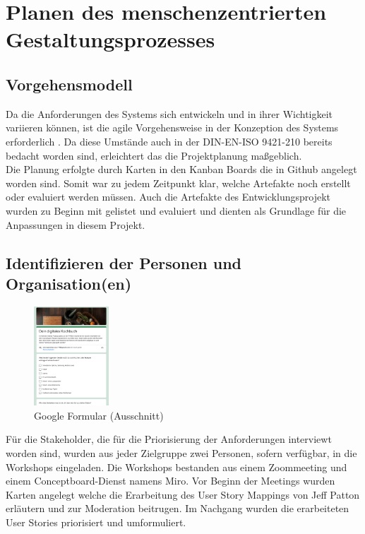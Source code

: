 \chapter{Planen des menschenzentrierten Gestaltungsprozesses}
\section{Vorgehensmodell}
Da die Anforderungen des Systems sich entwickeln und in ihrer Wichtigkeit variieren können, ist die agile Vorgehensweise in
der Konzeption des Systems erforderlich \citep[{``Agile methods are adaptive rather than predictive.''}]{TheNewMe5:online}. Da diese Umstände auch in der DIN-EN-ISO 9421-210 \citep{DINISO_2010} bereits bedacht worden sind, erleichtert das die Projektplanung maßgeblich.\\
Die Planung erfolgte durch Karten in den Kanban Boards die in Github angelegt worden sind. Somit war zu jedem Zeitpunkt klar, welche Artefakte noch erstellt oder evaluiert werden müssen. Auch die Artefakte des Entwicklungsprojekt wurden zu Beginn mit gelistet und evaluiert und dienten als Grundlage für die Anpassungen in diesem Projekt. \\

\section{Identifizieren der Personen und Organisation(en)}
\begin{figure}
  \centering
    \includegraphics[width=0.25\textwidth]{images/umfrage.png}
  \centering
\caption[Google Formular (Ausschnitt)]{Google Formular (Ausschnitt)}
\label{fig:googleforms}
\end{figure}
Für die Stakeholder, die für die Priorisierung der Anforderungen interviewt worden sind, wurden aus jeder Zielgruppe zwei Personen, sofern verfügbar, in die Workshops eingeladen. 
Die Workshops bestanden aus einem Zoommeeting und einem Conceptboard-Dienst namens Miro. Vor Beginn der Meetings wurden Karten angelegt welche die Erarbeitung des User Story Mappings von Jeff Patton \citep{Patton_2014} erläutern und zur Moderation beitrugen. Im Nachgang wurden die erarbeiteten User Stories priorisiert und umformuliert. \\
 \\ \\ \\
\newpage
